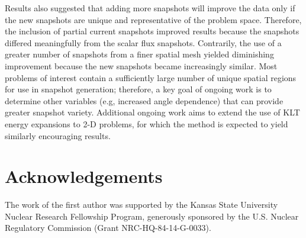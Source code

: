 \documentclass[5p,times,twocolumn,10pt]{elsarticle}
\begin{document}
    Results also suggested that adding more snapshots will improve the data only
    if the new snapshots are unique and representative of the problem space.
    Therefore, the inclusion of partial current snapshots improved results
    because the snapshots differed meaningfully from the scalar flux snapshots.
    Contrarily, the use of a greater number of snapshots from a finer spatial
    mesh yielded diminishing improvement because the new snapshots became
    increasingly similar. Most problems of interest contain a sufficiently
    large number of unique spatial regions for use in snapshot generation;
    therefore, a key goal of ongoing work is to determine other variables (e.g,
    increased angle dependence) that can provide greater snapshot variety.
    Additional ongoing work aims to extend the use of KLT energy expansions to
    2-D problems, for which the method is expected to yield similarly
    encouraging results.

    \section{Acknowledgements}
    The work of the first author was supported by the Kansas State University
Nuclear Research Fellowship Program, generously sponsored by the U.S. Nuclear
Regulatory Commission (Grant NRC-HQ-84-14-G-0033).

    
    
\end{document}
